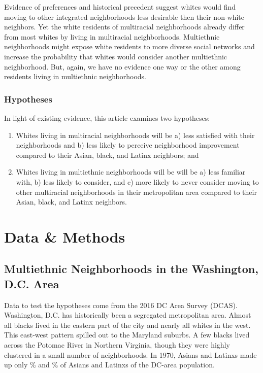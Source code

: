 \documentclass{baderart}
\newcommand{\TK}[1][]{\strong{TK #1}}
\begin{document}
Evidence of preferences and historical precedent suggest whites would find moving to other integrated neighborhoods less desirable then their non-white neighbors. Yet the white residents of multiracial neighborhoods already differ from most whites by living in multiracial neighborhoods. Multiethnic neighborhoods might expose white residents to more diverse social networks and increase the probability that whites would consider another multiethnic neighborhood. But, again, we have no evidence one way or the other among residents living in multiethnic neighborhoods.

\subsubsection{Hypotheses}\label{hypotheses}

In light of existing evidence, this article examines two hypotheses:


\begin{enumerate} 

\item   Whites living in multiracial neighborhoods will be a) less satisfied  with their neighborhoods and b) less likely to perceive neighborhood  improvement compared to their Asian, black, and Latinx neighbors; and 

\item   Whites living in multiethnic neighborhoods will be will be a) less familiar with, b) less likely to consider, and c) more likely to never consider moving to other multiracial neighborhoods in their metropolitan area compared to their Asian, black, and Latinx neighbors. 

\end{enumerate}

\section{Data \& Methods}\label{data}
\subsection{Multiethnic Neighborhoods in the Washington, D.C. Area}\label{multiethnic-neighborhoods-in-the-washington-d.c.-area}

Data to test the hypotheses come from the 2016 DC Area Survey (DCAS). Washington, D.C. has historically been a segregated metropolitan area. Almost all blacks lived in the eastern part of the city and nearly all whites in the west. This east-west pattern spilled out to the Maryland suburbs. A few blacks lived across the Potomac River in Northern Virginia, though they were highly clustered in a small number of neighborhoods. In 1970, Asians and Latinxs made up only \TK\% and \TK\% of Asians and Latinxs of the DC-area population.
\end{document}
